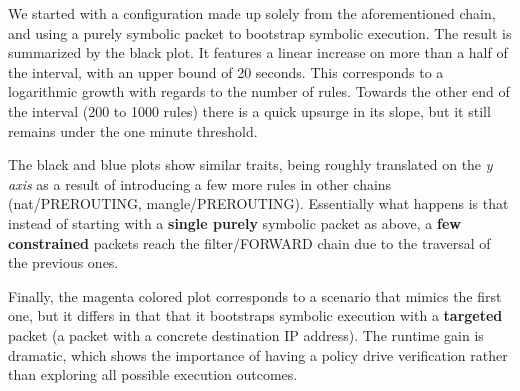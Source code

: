 We started with a configuration made up solely from the aforementioned chain,
and using a purely symbolic packet to bootstrap symbolic execution. The result
is summarized by the black plot.  It features a linear increase on more than a
half of the interval, with an upper bound of 20 seconds.  This corresponds to a
logarithmic growth with regards to the number of rules.  Towards the other end
of the interval (200 to 1000 rules) there is a quick upsurge in its slope, but
it still remains under the one minute threshold.

The black and blue plots show similar traits, being roughly translated on the
\emph{y axis} as a result of introducing a few more rules in other chains
(nat/PREROUTING, mangle/PREROUTING). Essentially what happens is that instead
of starting with a \textbf{single purely} symbolic packet as above, a
\textbf{few constrained} packets reach the filter/FORWARD chain due to the
traversal of the previous ones.

Finally, the magenta colored plot corresponds to a scenario that mimics the
first one, but it differs in that that it bootstraps symbolic execution with a
\textbf{targeted} packet (a packet with a concrete destination IP address). The
runtime gain is dramatic, which shows the importance of having a policy drive
verification rather than exploring all possible execution outcomes.

